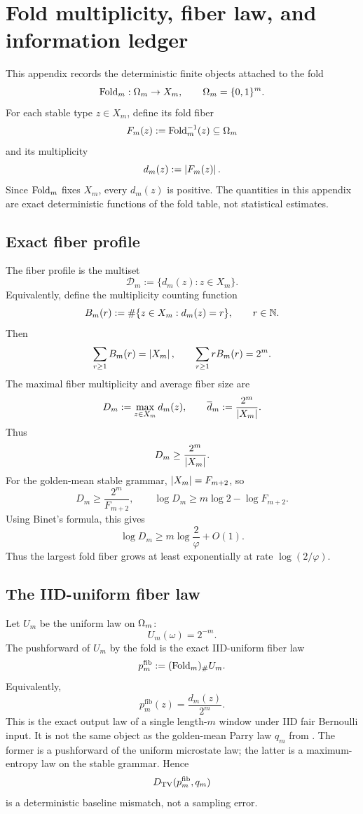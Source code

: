 \section{Fold multiplicity, fiber law, and information ledger}
\label{app:fiber-ledger}
\label{app:finite-graph-certificates}

This appendix records the deterministic finite objects attached to the fold
\[
\operatorname{Fold}_m:\Omega_m\to X_m,\qquad \Omega_m=\{0,1\}^m .
\]
For each stable type \(z\in X_m\), define its fold fiber
\[
F_m(z):=\operatorname{Fold}_m^{-1}(z)\subseteq \Omega_m
\]
and its multiplicity
\[
d_m(z):=\left|F_m(z)\right|.
\]
Since \(\operatorname{Fold}_m\) fixes \(X_m\), every \(d_m(z)\) is positive.  The quantities in this appendix are exact deterministic functions of the fold table, not statistical estimates.

\subsection{Exact fiber profile}

The fiber profile is the multiset
\[
\mathcal D_m:=\{d_m(z):z\in X_m\}.
\]
Equivalently, define the multiplicity counting function
\[
B_m(r):=\#\{z\in X_m:d_m(z)=r\},\qquad r\in\mathbb{N} .
\]
Then
\[
\sum_{r\ge1}B_m(r)=\left|X_m\right|,
\qquad
\sum_{r\ge1}rB_m(r)=2^m.
\]
The maximal fiber multiplicity and average fiber size are
\[
D_m:=\max_{z\in X_m}d_m(z),
\qquad
\overline d_m:=\frac{2^m}{\left|X_m\right|}.
\]
Thus
\[
D_m\ge \frac{2^m}{\left|X_m\right|}.
\]
For the golden-mean stable grammar, \(\left|X_m\right|=F_{m+2}\), so
\[
D_m\ge \frac{2^m}{F_{m+2}},
\qquad
\log D_m\ge m\log2-\log F_{m+2}.
\]
Using Binet's formula, this gives
\[
\log D_m\ge m\log\frac2\varphi+O(1).
\]
Thus the largest fold fiber grows at least exponentially at rate \(\log(2/\varphi)\).

\subsection{The IID-uniform fiber law}

Let \(U_m\) be the uniform law on \(\Omega_m\):
\[
U_m(\omega)=2^{-m}.
\]
The pushforward of \(U_m\) by the fold is the exact IID-uniform fiber law
\[
p_m^{\mathrm{fib}}:=(\operatorname{Fold}_m)_\# U_m.
\]
Equivalently,
\[
\boxed{
p_m^{\mathrm{fib}}(z)=\frac{d_m(z)}{2^m}.
}
\]
This is the exact output law of a single length-\(m\) window under IID fair Bernoulli input.  It is not the same object as the golden-mean Parry law \(q_m\) from .  The former is a pushforward of the uniform microstate law; the latter is a maximum-entropy law on the stable grammar.  Hence
\[
D_{\mathrm{TV}}(p_m^{\mathrm{fib}},q_m)
\]
is a deterministic baseline mismatch, not a sampling error.

